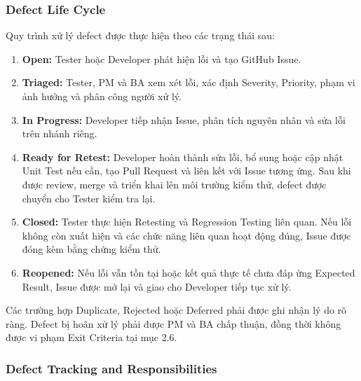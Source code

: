 \subsubsection*{Defect Life Cycle}

Quy trình xử lý defect được thực hiện theo 
các trạng thái sau:

\begin{enumerate}
    \item \textbf{Open:}
    Tester hoặc Developer phát hiện lỗi và 
    tạo GitHub Issue.

    \item \textbf{Triaged:}
    Tester, PM và BA xem xét lỗi, xác định 
    Severity, Priority, phạm vi ảnh hưởng 
    và phân công người xử lý.

    \item \textbf{In Progress:}
    Developer tiếp nhận Issue, phân tích 
    nguyên nhân và sửa lỗi trên nhánh riêng.

    \item \textbf{Ready for Retest:}
    Developer hoàn thành sửa lỗi, bổ sung 
    hoặc cập nhật Unit Test nếu cần, tạo 
    Pull Request và liên kết với Issue tương ứng. 
    Sau khi được review, merge và triển khai 
    lên môi trường kiểm thử, defect được 
    chuyển cho Tester kiểm tra lại.

    \item \textbf{Closed:}
    Tester thực hiện Retesting và Regression 
    Testing liên quan. Nếu lỗi không còn xuất hiện 
    và các chức năng liên quan hoạt động đúng, 
    Issue được đóng kèm bằng chứng kiểm thử.

    \item \textbf{Reopened:}
    Nếu lỗi vẫn tồn tại hoặc kết quả thực tế 
    chưa đáp ứng Expected Result, Issue được 
    mở lại và giao cho Developer tiếp tục xử lý.
\end{enumerate}

Các trường hợp Duplicate, Rejected hoặc Deferred 
phải được ghi nhận lý do rõ ràng. Defect bị hoãn 
xử lý phải được PM và BA chấp thuận, đồng thời 
không được vi phạm Exit Criteria tại mục 2.6.

\subsubsection*{Defect Tracking and Responsibilities}

